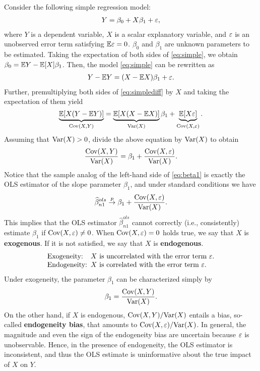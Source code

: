 \documentclass[11pt, A4paper, openany, uplatex]{book}
\begin{document}
Consider the following simple regression model:
\begin{align}\label{eq:simple}
Y = \beta_0 + X\beta_1 + \varepsilon,
\end{align}
where $Y$ is a dependent variable, $X$ is a scalar explanatory variable, and $\varepsilon$ is an unobserved error term satisfying $\mathbb{E} \varepsilon = 0$.
$\beta_0$ and $\beta_1$ are unknown parameters to be estimated.
Taking the expectation of both sides of \eqref{eq:simple}, we obtain $\beta_0 = \mathbb{E} Y - \mathbb{E} [X] \beta_1$.
Then, the model \eqref{eq:simple} can be rewritten as
\begin{align}\label{eq:simplediff}
Y - \mathbb{E} Y = (X - \mathbb{E} X)\beta_1 + \varepsilon.
\end{align}
Further, premultiplying both sides of \eqref{eq:simplediff} by $X$ and taking the expectation of them yield
\[
\underbrace{\mathbb{E}[X(Y - \mathbb{E} Y)]}_{\mathrm{Cov}(X,Y)} = \underbrace{\mathbb{E}[X (X - \mathbb{E} X)]}_{\mathrm{Var}(X)} \beta_1 + \underbrace{\mathbb{E}[X \varepsilon]}_{\mathrm{Cov}(X, \varepsilon)}.
\]
Assuming that $\mathrm{Var}(X) > 0$, divide the above equation by $\mathrm{Var}(X)$ to obtain
\begin{align}\label{eq:beta1}
\frac{\mathrm{Cov}(X,Y)}{\mathrm{Var}(X)} = \beta_1 + \frac{\mathrm{Cov}(X,\varepsilon)}{\mathrm{Var}(X)}.
\end{align}
Notice that the sample analog of the left-hand side of \eqref{eq:beta1} is exactly the OLS estimator of the slope parameter $\beta_1$, and under standard conditions we have
\[
	\widehat \beta_{n1}^{ols} \overset{p}{\to} \beta_1 + \frac{\mathrm{Cov}(X,\varepsilon)}{\mathrm{Var}(X)}.
\]
This implies that the OLS estimator $\hat \beta_{n1}^{ols} $ cannot correctly (i.e., consistently) estimate $\beta_1$ if $\mathrm{Cov}(X, \varepsilon) \neq 0$.
When $\mathrm{Cov}(X, \varepsilon) = 0$ holds true, we say that $X$ is \textbf{exogenous}.
If it is not satisfied, we say that $X$ is \textbf{endogenous}.
\[
\begin{array}{ll}
\text{Exogeneity:} & \hspace{-5pt}\text{$X$ is uncorrelated with the error term $\varepsilon$.} \\
\text{Endogeneity:} & \hspace{-5pt}\text{$X$ is correlated with the error term $\varepsilon$.} \\
\end{array}
\]
Under exogeneity, the parameter $\beta_1$ can be characterized simply by 
\begin{equation*}
	\beta_1 = \frac{\mathrm{Cov}(X, Y)}{\mathrm{Var}(X) }.
\end{equation*}
On the other hand, if $X$ is endogenous, $\mathrm{Cov}(X, Y)/\mathrm{Var}(X)$ entails a bias, so-called \textbf{endogeneity bias}, that amounts to $\mathrm{Cov} ( X, \varepsilon )/\mathrm{Var}(X)$.
In general, the magnitude and even the sign of the endogeneity bias are uncertain because $\varepsilon$ is unobservable.
Hence, in the presence of endogeneity, the OLS estimator is inconsistent, and thus the OLS estimate is uninformative about the true impact of $X$ on $Y$.
\bigskip
\end{document}
